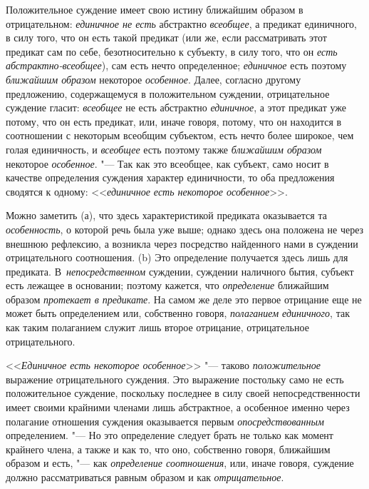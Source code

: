 Положительное суждение имеет свою истину ближайшим образом в
отрицательном: {\em единичное не есть} абстрактно {\em всеобщее}, а
предикат единичного, в силу того, что он есть такой предикат (или же, если
рассматривать этот предикат сам по себе, безотносительно к субъекту, в силу
того, что он {\em есть абстрактно-всеобщее}), сам есть нечто определенное;
{\em единичное} есть поэтому {\em ближайшим образом}
некоторое {\em особенное}. Далее,
согласно другому предложению, содержащемуся в положительном суждении,
отрицательное суждение гласит: {\em всеобщее} не есть
абстрактно {\em единичное},
а этот предикат уже потому, что он есть предикат, или, иначе
говоря, потому, что он находится в соотношении с некоторым всеобщим
субъектом, есть нечто более широкое, чем голая единичность, и
{\em всеобщее} есть поэтому также {\em ближайшим образом}
некоторое {\em особенное}. "--- Так
как это всеобщее, как субъект, само носит в качестве определения суждения
характер единичности, то оба предложения сводятся к одному:
<<{\em единичное есть некоторое особенное}>>.

Можно заметить (а), что здесь характеристикой предиката
оказывается та {\em особенность}, о которой речь была уже
выше;
однако здесь она положена не через внешнюю рефлексию, а
возникла через посредство найденного нами в суждении отрицательного
соотношения. (b) Это определение получается здесь лишь для предиката.
В~{\em непосредственном}
суждении, суждении наличного бытия, субъект есть лежащее в
основании; поэтому кажется, что {\em определение} ближайшим образом
{\em протекает в предикате}.
На самом же деле это первое отрицание еще не может быть
определением или, собственно говоря, {\em полаганием единичного},
так как таким полаганием служит лишь второе отрицание,
отрицательное отрицательного.

<<{\em Единичное есть некоторое особенное}>> "--- таково {\em положительное}
выражение отрицательного суждения. Это
выражение постольку само не есть положительное суждение,
поскольку последнее в силу своей непосредственности имеет своими крайними
членами лишь абстрактное, а особенное именно через полагание отношения
суждения оказывается первым {\em опосредствованным}
определением. "--- Но это определение следует
брать не только как момент крайнего члена, а также и как то, что оно,
собственно говоря, ближайшим образом и есть, "--- как
{\em определение соотношения},
или, иначе говоря, суждение должно рассматриваться равным
образом и как {\em отрицательное}.

